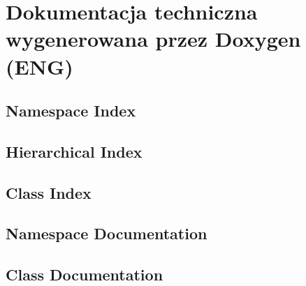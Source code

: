 \chapter{Dokumentacja techniczna wygenerowana przez Doxygen (ENG)}
\thispagestyle{chapterBeginStyle}

\section{Namespace Index}

\clearpage
\section{Hierarchical Index}

\clearpage
\section{Class Index}

\clearpage
\section{Namespace Documentation}







\clearpage
\section{Class Documentation}






















